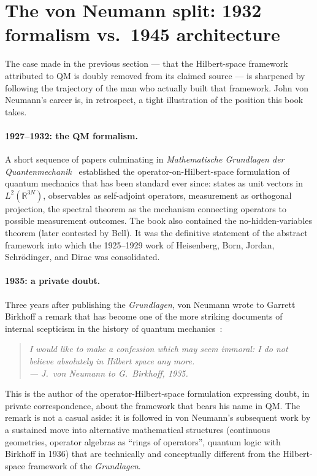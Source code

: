 \section{The von Neumann split: 1932 formalism vs.\ 1945 architecture}\label{sec:von-neumann-split}

The case made in the previous section --- that the Hilbert-space framework attributed to QM is doubly removed from its claimed source --- is sharpened by following the trajectory of the man who actually built that framework. John von Neumann's career is, in retrospect, a tight illustration of the position this book takes.

\paragraph{1927--1932: the QM formalism.}
A short sequence of papers culminating in \emph{Mathematische Grundlagen der Quantenmechanik}~\cite{vonNeumann1932} established the operator-on-Hilbert-space formulation of quantum mechanics that has been standard ever since: states as unit vectors in $L^2(\mathbb{R}^{3N})$, observables as self-adjoint operators, measurement as orthogonal projection, the spectral theorem as the mechanism connecting operators to possible measurement outcomes. The book also contained the no-hidden-variables theorem (later contested by Bell). It was the definitive statement of the abstract framework into which the 1925--1929 work of Heisenberg, Born, Jordan, Schr\"odinger, and Dirac was consolidated.

\paragraph{1935: a private doubt.}
Three years after publishing the \emph{Grundlagen}, von Neumann wrote to Garrett Birkhoff a remark that has become one of the more striking documents of internal scepticism in the history of quantum mechanics~\cite{Redei2005}:

\begin{quote}
\itshape I would like to make a confession which may seem immoral: I do not believe absolutely in Hilbert space any more.\\
\hfill --- J.~von Neumann to G.~Birkhoff, 1935.
\end{quote}

This is the author of the operator-Hilbert-space formulation expressing doubt, in private correspondence, about the framework that bears his name in QM. The remark is not a casual aside: it is followed in von Neumann's subsequent work by a sustained move into alternative mathematical structures (continuous geometries, operator algebras as ``rings of operators'', quantum logic with Birkhoff in 1936) that are technically and conceptually different from the Hilbert-space framework of the \emph{Grundlagen}.

